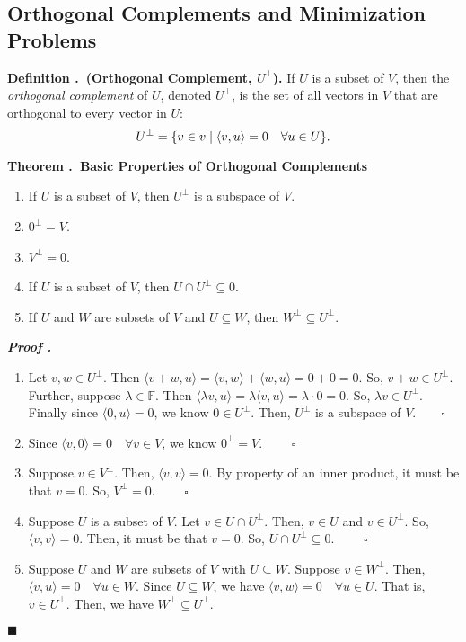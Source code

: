 \documentclass[11pt, letterpaper]{article}
\newcounter{index}[subsection]
\newenvironment*{df}[1]{\par\noindent\textbf{Definition \thesubsection.\stepcounter{index}\theindex\ (#1).}}{\par}
\newenvironment*{thm}[1]{\begin{tcolorbox}\par\noindent\textbf{Theorem \thesubsection.\stepcounter{index}\theindex\ #1} \par}{\par\end{tcolorbox}}
\newcounter{nprf}[subsection]
\newenvironment*{prf}{\par\indent\textbf{\textit{Proof \stepcounter{nprf}\thenprf.}}}{\hfill$\blacksquare$\par}
\def\F{\mathbb{F}}
\def\pqde{\qquad\square}
\begin{document}
\newpage
\subsection{Orthogonal Complements and Minimization Problems}
\begin{df}{Orthogonal Complement, $U^\perp$}
	If $U$ is a subset of $V$, then the \textit{orthogonal complement} of $U$, denoted $U^\perp$, is the set of all vectors in $V$ that are orthogonal to every vector in $U$: \[U^\perp=\qty{v\in v\mid\langle v,u\rangle=0\quad\forall u\in U}.\]	
\end{df}
\begin{thm}{Basic Properties of Orthogonal Complements}
	\begin{enumerate}
		\item If $U$ is a subset of $V$, then $U^\perp$ is a subspace of $V$.
		\item $\qty{0}^\perp=V$.
		\item $V^\perp=\qty{0}$.
		\item If $U$ is a subset of $V$, then $U\cap U^\perp\subseteq\qty{0}$.
		\item If $U$ and $W$ are subsets of $V$ and $U\subseteq W$, then $W^\perp\subseteq U^\perp$.
	\end{enumerate}	
\end{thm}
\begin{prf}
	\begin{enumerate}
		\item Let $v,w\in U^\perp$. Then $\langle v+w,u\rangle=\langle v,w\rangle+\langle w,u\rangle=0+0=0$. So, $v+w\in U^\perp$. Further, suppose $\lambda\in\F$. Then $\langle\lambda v,u\rangle=\lambda\langle v,u\rangle=\lambda\cdot0=0$. So, $\lambda v\in U^\perp$. Finally since $\langle0,u\rangle=0$, we know $0\in U^\perp$. Then, $U^\perp$ is a subspace of $V$.$\pqde$
		\item Since $\langle v,0\rangle=0\quad\forall v\in V$, we know $\qty{0}^\perp=V$. $\pqde$
		\item Suppose $v\in V^\perp$. Then, $\langle v,v\rangle=0$. By property of an inner product, it must be that $v=0$. So, $V^\perp=\qty{0}$. $\pqde$
		\item Suppose $U$ is a subset of $V$. Let $v\in U\cap U^\perp$. Then, $v\in U$ and $v\in U^\perp$. So, $\langle v,v\rangle=0$. Then, it must be that $v=0$. So, $U\cap U^\perp\subseteq\qty{0}$. $\pqde$
		\item Suppose $U$ and $W$ are subsets of $V$ with $U\subseteq W$. Suppose $v\in W^\perp$. Then, $\langle v,u\rangle=0\quad\forall u\in W$. Since $U\subseteq W$, we have $\langle v,w\rangle=0\quad\forall u\in U$. That is, $v\in U^\perp$. Then, we have $W^\perp\subseteq U^\perp$.
	\end{enumerate}	
\end{prf}
\end{document}
